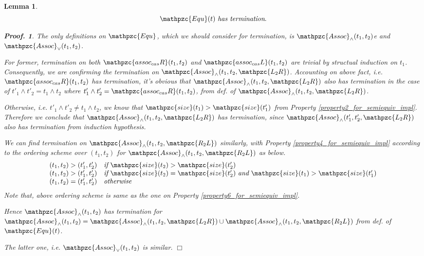 \documentclass[12pt]{article}
\newtheorem{Lemma}{Lemma}[section]
\newtheorem{Proof}{Proof.}
\begin{document}
\begin{Lemma}
  \[ \mathpzc{Equ}(t)\ \text{\it has termination}.
  \]
  \begin{Proof}
    The only definitions on $\mathpzc{Equ}$, which we should consider
    for termination, is $\mathpzc{Assoc}_\wedge(t_1, t_2)$e and
    $\mathpzc{Assoc}_\vee(t_1, t_2)$.
    
    For former, termination on both $\mathpzc{assoc_{cas}R}(t_1, t_2)$ and
    $\mathpzc{assoc_{cas}L}(t_1, t_2)$ are trivial by structual induction
    on $t_1$.
    Consequently, we are confirming the termination on
    $\mathpzc{Assoc}_\wedge(t_1, t_2, \mathpzc{L_2R})$.
    Accounting on above fact, i.e. $\mathpzc{assoc_{cas}R}(t_1, t_2)$
    has termination, it's obvious that
    $\mathpzc{Assoc}_\wedge(t_1, t_2, \mathpzc{L_2R})$ also has termination
    in the case of $t'_1 \wedge t'_2 = t_1 \wedge t_2$ where
    $t'_1 \wedge t'_2 = \mathpzc{assoc_{cas}R}(t_1, t_2)$, from
    def. of $\mathpzc{Assoc}_\wedge(t_1, t_2, \mathpzc{L_2R})$.
    
    Otherwise, i.e. $t'_1 \wedge t'_2 \neq t_1 \wedge t_2$, we know that
    $\mathpzc{size}(t_1) > \mathpzc{size}(t'_1)$ from Property
    \ref{property2_for_semiequiv_impl}. Therefore we conclude that
    $\mathpzc{Assoc}_\wedge(t_1, t_2, \mathpzc{L_2R})$ has
    termination, since $\mathpzc{Assoc}_\wedge(t'_1, t'_2, \mathpzc{L_2R})$
    also has termination from induction hypothesis.

    We can find termination on
    $\mathpzc{Assoc}_\wedge(t_1, t_2, \mathpzc{R_2L})$ similarly, with
    Property \ref{property4_for_semiequiv_impl} according to the
    ordering scheme over $(t_1, t_2)$ for
    $\mathpzc{Assoc}_\wedge(t_1, t_2, \mathpzc{R_2L})$ as below.
    \[ \begin{array}{l}
      (t_1, t_2) > (t'_1, t'_2) \quad
       \text{\it if}\ \mathpzc{size}(t_2) > \mathpzc{size}(t'_2)  \\
      (t_1, t_2) > (t'_1, t'_2) \quad
       \text{\it if}\ \mathpzc{size}(t_2) = \mathpzc{size}(t'_2)\
        \text{\it and}\ \mathpzc{size}(t_1) > \mathpzc{size}(t'_1)  \\
      (t_1, t_2) = (t'_1, t'_2) \quad \text{\it otherwise}
    \end{array}
    \]
    Note that, above ordering scheme is same as the one on Property
    \ref{property6_for_semiequiv_impl}.
    
    Hence $\mathpzc{Assoc}_\wedge(t_1, t_2)$ has termination for
    $\mathpzc{Assoc}_\wedge(t_1, t_2) =
    \mathpzc{Assoc}_\wedge(t_1, t_2, \mathpzc{L_2R}) \cup
    \mathpzc{Assoc}_\wedge(t_1, t_2, \mathpzc{R_2L})$ from def. of
    $\mathpzc{Equ}(t)$.
    
    The latter one, i.e. $\mathpzc{Assoc}_\vee(t_1, t_2)$ is similar.
    $\Box$
  \end{Proof}
\end{Lemma}
\end{document}
